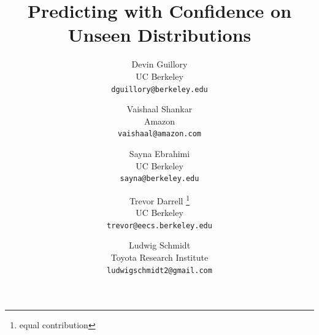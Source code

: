 
\title{Predicting with Confidence on Unseen Distributions}

\author{Devin Guillory\\
UC Berkeley\\
{\tt\small dguillory@berkeley.edu}
\and
Vaishaal Shankar\\
Amazon\\
{\tt\small vaishaal@amazon.com}

\and
Sayna Ebrahimi\\
UC Berkeley\\
{\tt\small sayna@berkeley.edu}
\and
Trevor Darrell \thanks{equal contribution}\\
UC Berkeley\\
{\tt\small trevor@eecs.berkeley.edu}
\and

Ludwig Schmidt \footnotemark[1]\\
Toyota Research Institute\\
{\tt\small ludwigschmidt2@gmail.com}
}

\maketitle
